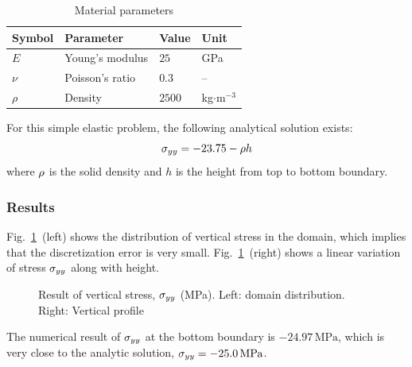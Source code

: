 \begin{table}[!htb]
\centering
\caption{Material parameters}
\label{Me_tme:el2d}
\begin{tabular}{llll}
\toprule
Symbol & Parameter & Value & Unit \\
\midrule
$E$    & Young's modulus & $25$   & GPa \\
$\nu$  & Poisson's ratio & $0.3$  & -- \\
$\rho$ & Density         & $2500$ & kg$\cdot$m$^{-3}$ \\
\bottomrule
\end{tabular}
\end{table}

For this simple elastic problem, the following analytical solution exists:
\begin{equation}
 \stress_{yy} = -23.75-\dens h
  \label{Me_eq:ex1_ana}
\end{equation}
where $\rho$ is the solid density and $h$ is the height from top to bottom boundary.

\subsubsection{Results}
\label{subsubsec:Me1_res}

Fig.~\mbox{\ref{Me_fme:e1_syy} (left)} shows the distribution of vertical stress in the domain, which implies that the discretization error is very small. Fig.~\mbox{\ref{Me_fme:e1_syy} (right)} shows a linear variation of stress $\sigma_{yy}$ along with height.
\begin{figure}[!thb]
  \begin{center}
  \end{center}
  \caption{Result of vertical stress, $\sigma_{yy}$ (MPa). Left: domain distribution. Right: Vertical profile}
  \label{Me_fme:e1_syy}
\end{figure}

The numerical result of $\sigma_{yy}$ at the bottom boundary is $-24.97\,\mbox{MPa}$, which is very close to the analytic solution, $\sigma_{yy}=-25.0\,\mbox{MPa}$.
